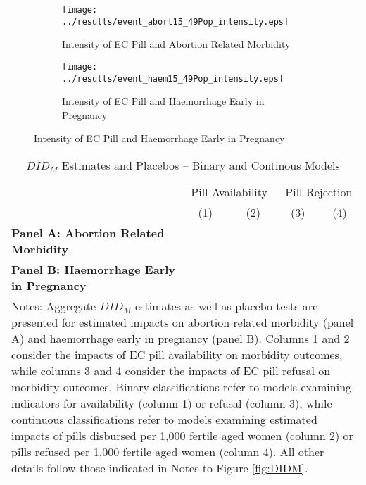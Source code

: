 \documentclass[12pt]{article}
\begin{document}
\begin{figure}[htpb!]
  \caption{Event Study Tests of the Intensity of the EC Pill on Maternal Health Outcomes}
  \label{fig:eventsIntensity}
  \begin{center}

   \begin{subfigure}{0.99\textwidth}
      \texttt{[image: ../results/event\_abort15\_49Pop\_intensity.eps]}
      \caption{Intensity of EC Pill and Abortion Related Morbidity}
      \label{fig:AI}
    \end{subfigure}

    \begin{subfigure}{0.99\textwidth}
        \texttt{[image: ../results/event\_haem15\_49Pop\_intensity.eps]}
        \caption{Intensity of EC Pill and Haemorrhage Early in Pregnancy}
        \label{fig:HI}
    \end{subfigure}
    
  \end{center}
\end{figure}


\begin{table}
  \centering
  \caption{$DID_M$ Estimates and Placebos -- Binary and Continous Models}
  \label{tab:DIDM}
  \begin{tabular}{lcccc}\toprule
    & \multicolumn{2}{c}{Pill Availability} & \multicolumn{2}{c}{Pill Rejection} \\ \cmidrule(r){2-3}\cmidrule(r){4-5}
    & (1) & (2) & (3) & (4) \\ \midrule
    \textbf{Panel A: Abortion Related Morbidity} &&&& \\
     \midrule
    \textbf{Panel B: Haemorrhage Early in Pregnancy} &&&& \\
     \bottomrule
    \multicolumn{5}{p{16.2cm}}{{\footnotesize Notes: Aggregate $DID_M$ estimates as well as placebo tests are presented for estimated impacts on abortion related morbidity (panel A) and haemorrhage early in pregnancy (panel B).  Columns 1 and 2 consider the impacts of EC pill availability on morbidity outcomes, while columns 3 and 4 consider the impacts of EC pill refusal on morbidity outcomes.  Binary classifications refer to models examining indicators for availability (column 1) or refusal (column 3), while continuous classifications refer to models examining estimated impacts of pills disbursed per 1,000 fertile aged women (column 2) or pills refused per 1,000 fertile aged women (column 4).  All other details follow those indicated in Notes to Figure \ref{fig:DIDM}.}}
  \end{tabular}
\end{table}
\end{document}
